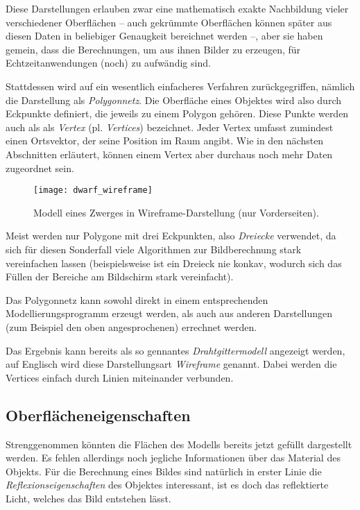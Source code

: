 Diese Darstellungen erlauben zwar eine mathematisch exakte Nachbildung vieler verschiedener Oberflächen -- auch gekrümmte Oberflächen können später aus diesen Daten in beliebiger Genaugkeit bereichnet werden --, aber sie haben gemein, dass die Berechnungen, um aus ihnen Bilder zu erzeugen, für Echtzeitanwendungen (noch) zu aufwändig sind.

Stattdessen wird auf ein wesentlich einfacheres Verfahren zurückgegriffen, nämlich die Darstellung als \emph{Polygonnetz}. Die Oberfläche eines Objektes wird also durch Eckpunkte definiert, die jeweils zu einem Polygon gehören. Diese Punkte werden auch als als \emph{Vertex} (pl. \emph{Vertices}) bezeichnet. Jeder Vertex umfasst zumindest einen Ortsvektor, der seine Position im Raum angibt. Wie in den nächsten Abschnitten erläutert, können einem Vertex aber durchaus noch mehr Daten zugeordnet sein.

\begin{wrapfigure}{R}{0.4\textwidth}
  \vspace{-10pt}
  \texttt{[image: dwarf\_wireframe]}
  \vspace{-10pt}
  \caption{Modell eines Zwerges in Wireframe-Darstellung (nur Vorderseiten).}
\end{wrapfigure}

Meist werden nur Polygone mit drei Eckpunkten, also \emph{Dreiecke} verwendet, da sich für diesen Sonderfall viele Algorithmen zur Bildberechnung stark vereinfachen lassen (beispielsweise ist ein Dreieck nie konkav, wodurch sich das Füllen der Bereiche am Bildschirm stark vereinfacht).

Das Polygonnetz kann sowohl direkt in einem entsprechenden Modellierungsprogramm erzeugt werden, als auch aus anderen Darstellungen (zum Beispiel den oben angesprochenen) errechnet werden.

Das Ergebnis kann bereits als so gennantes \emph{Drahtgittermodell} angezeigt werden, auf Englisch wird diese Darstellungsart \emph{Wireframe} genannt. Dabei werden die Vertices einfach durch Linien miteinander verbunden.

\subsection{Oberflächeneigenschaften}
Strenggenommen könnten die Flächen des Modells bereits jetzt gefüllt dargestellt werden. Es fehlen allerdings noch jegliche Informationen über das Material des Objekts. Für die Berechnung eines Bildes sind natürlich in erster Linie die \emph{Reflexionseigenschaften} des Objektes interessant, ist es doch das reflektierte Licht, welches das Bild entstehen lässt.

